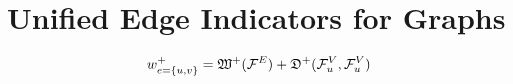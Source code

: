 \flushleft
\chapter{Unified Edge Indicators for Graphs}\label{ch:edge_indicators} 

\begin{equation}
    w^+_{e=\{ u,v\}} =  
        \mathfrak{W}^+(\mathcal{F}^E) + 
        \mathfrak{D}^+(\mathcal{F}^V_u , \mathcal{F}^V_u)
\end{equation}






